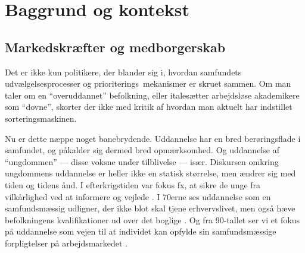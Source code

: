 \renewcommand*{\afterpartskip}{
\vfil\epigraph{\itshape
Danmark mangler allerede nu kvalificeret arbejdskraft, og manglen vil vokse markant de kommende år. Tal fra Arbejderbevægelsens Erhvervsråd viser, at der de kommende ti år vil komme til at mangle omkring 70.000 faglærte. Alene jern- og metalindustriend vil mangle 30.000 faglærte, og tæller vi handels- og kontorområdet med, kan vi lægge yderligere 12.000 oven i. Udover faglærte vil der komme til at mangle flere end 60.000 personer med korte og mellemlange videregående uddannelser.

Samtidig vil omkring 55.000 personer med en lang videregående uddannelse være i overskud i år 2030.
}
{Claus Jensen, forbundsformand, Dansk Metal og Kim Simonsen, forbundsformand, HK, kronik i Berlingske Tidende, 3. april \citeyear{simonsenLadOsGore2016}}
}

\part{Baggrund og kontekst}\label{part:baggrund}

\chapter{Markedskræfter og medborgerskab}\label{chap:marked}

Det er ikke kun politikere, der blander sig i, hvordan samfundets udvælgelsesprocesser og prioriterings\ mekanismer er skruet sammen.
Om man taler om en “overuddannet” befolkning, eller italesætter arbejdsløse akademikere som “dovne”, skorter der ikke med kritik af hvordan man aktuelt har indstillet sorteringsmaskinen.

Nu er dette næppe noget banebrydende.
Uddannelse har en bred berøringsflade i samfundet, og påkalder sig dermed bred opmærksomhed.
Og uddannelse af “ungdommen” — disse voksne under tilblivelse — især.
Diskursen omkring ungdommens uddannelse er heller ikke en statisk størrelse, men ændrer sig med tiden og tidens ånd.
I efterkrigstiden var fokus fx, at sikre de unge fra vilkårlighed ved at informere og vejlede \autocite[s 17ff]{juulDiskurserOmUngdom2013}.
I 70erne ses uddannelse som en samfundsmæssig udligner, der ikke blot skal tjene erhvervslivet, men også hæve befolkningens kvalifikationer ud over det boglige \autocite[s 15ff]{juulDiskurserOmUngdom2013}.
Og fra 90-tallet ser vi et fokus på uddannelse som vejen til at individet kan opfylde sin samfundsmæssige forpligtelser på arbejdsmarkedet \autocite[s. 18]{juulDiskurserOmUngdom2013}.

